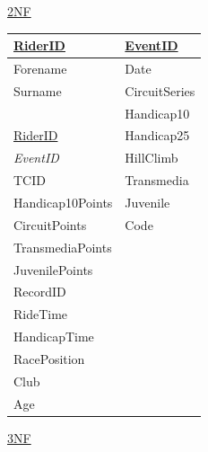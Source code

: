 \underline{2NF}

\begin{tabular}{|l|l|}
\hline
\underline{RiderID} & \underline{EventID} \\ \hline
Forename            & Date                \\ \hline
Surname             & CircuitSeries       \\ \hline
                    & Handicap10          \\ \hline
\underline{RiderID} & Handicap25          \\ \hline
\emph{EventID}      & HillClimb           \\ \hline 
TCID                & Transmedia          \\ \hline 
Handicap10Points    & Juvenile            \\ \hline
CircuitPoints       & Code                \\ \hline 
TransmediaPoints    &                     \\ \hline
JuvenilePoints      &                     \\ \hline
RecordID            &                     \\ \hline
RideTime            &                     \\ \hline
HandicapTime        &                     \\ \hline
RacePosition        &                     \\ \hline
Club                &                     \\ \hline
Age                 &                     \\ \hline
\end{tabular}

\underline{3NF}

